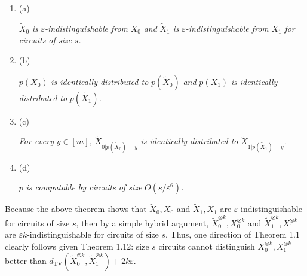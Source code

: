 \begin{enumerate}


\item[] 
(a) 


$\widetilde{X}_{0}$\emph{ is }$\varepsilon$\emph{-indistinguishable from }$X_{0}$\emph{ and }$\widetilde{X}_{1}$\emph{ is }$\varepsilon$\emph{-indistinguishable from }$X_{1}$\emph{ for circuits of size }$s$\emph{.}\par





\item[] 
(b) 


$p(X_{0})$\emph{ is identically distributed to }$p(\widetilde{X}_{0})$\emph{ and }$p(X_{1})$\emph{ is identically distributed to }$p(\widetilde{X}_{1})$\emph{.}\par





\item[] 
(c) 


\emph{For every }$y\in[m]$\emph{, }$\widetilde{X}_{0|p(\widetilde{X}_{0})=y}$\emph{ is identically distributed to }$\widetilde{X}_{1|p(\widetilde{X}_{1})=y}$\emph{.}\par





\item[] 
(d) 


$p$\emph{ is computable by circuits of size }$O(s/\varepsilon^{6})$\emph{.}\par





\end{enumerate}






Because the above theorem shows that $\widetilde{X}_{0},X_{0}$ and $\widetilde{X}_{1},X_{1}$ are $\varepsilon$-indistinguishable for circuits of size $s$, then by a simple hybrid argument, $\widetilde{X}_{0}^{\otimes k},X_{0}^{\otimes k}$ and $\widetilde{X}_{1}^{\otimes k},X_{1}^{\otimes k}$ are $\varepsilon k$-indistinguishable for circuits of size $s$. Thus, one direction of Theorem 1.1 clearly follows given Theorem 1.12: size $s$ circuits cannot distinguish $X_{0}^{\otimes k},X_{1}^{\otimes k}$ better than $d_{\mathrm{TV}}(\widetilde{X}_{0}^{\otimes k},\widetilde{X}_{1}^{\otimes k})+2k\varepsilon$.\par




